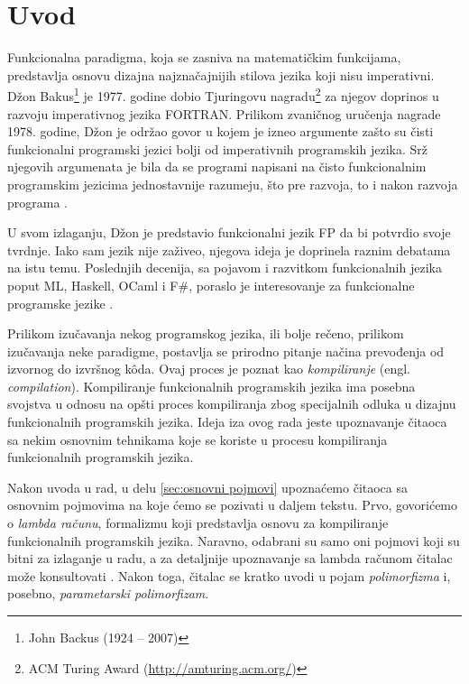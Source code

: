 \section{Uvod}
\label{sec:uvod}

Funkcionalna paradigma, koja se zasniva na matematičkim funkcijama, predstavlja osnovu dizajna najznačajnijih stilova jezika koji nisu imperativni. Džon Bakus\footnote{John Backus (1924 -- 2007)} je 1977. godine dobio Tjuringovu nagradu\footnote{ACM Turing Award (\url{http://amturing.acm.org/})} za njegov doprinos u razvoju imperativnog jezika FORTRAN. Prilikom zvaničnog uručenja nagrade 1978. godine, Džon je održao govor u kojem je izneo argumente zašto su čisti funkcionalni programski jezici bolji od imperativnih programskih jezika. Srž njegovih argumenata je bila da se programi napisani na čisto funkcionalnim programskim jezicima jednostavnije razumeju, što pre razvoja, to i nakon razvoja programa \cite{Can-Programming-Be-Liberated-from-the-von-Neumann-Style?, Concepts-of-Programming-Languages}.

U svom izlaganju, Džon je predstavio funkcionalni jezik FP da bi potvrdio svoje tvrdnje. Iako sam jezik nije zaživeo, njegova ideja je doprinela raznim debatama na istu temu. Poslednjih decenija, sa pojavom i razvitkom funkcionalnih jezika poput ML, Haskell, OCaml i F\#, poraslo je interesovanje za funkcionalne programske jezike \cite{Concepts-of-Programming-Languages}.

Prilikom izučavanja nekog programskog jezika, ili bolje rečeno, prilikom izučavanja neke paradigme, postavlja se prirodno pitanje načina prevođenja od izvornog do izvršnog k\^oda. Ovaj proces je poznat kao \textit{kompiliranje} (engl. \textit{compilation}). Kompiliranje funkcionalnih programskih jezika ima posebna svojstva u odnosu na opšti proces kompiliranja zbog specijalnih odluka u dizajnu funkcionalnih programskih jezika. Ideja iza ovog rada jeste upoznavanje čitaoca sa nekim osnovnim tehnikama koje se koriste u procesu kompiliranja funkcionalnih programskih jezika.

Nakon uvoda u rad, u delu \ref{sec:osnovni pojmovi} upoznaćemo čitaoca sa osnovnim pojmovima na koje ćemo se pozivati u daljem tekstu. Prvo, govorićemo o \textit{lambda računu}, formalizmu koji predstavlja osnovu za kompiliranje funkcionalnih programskih jezika. Naravno, odabrani su samo oni pojmovi koji su bitni za izlaganje u radu, a za detaljnije upoznavanje sa lambda računom čitalac može konsultovati \cite{Introduction-to-Combinators-and-Lambda-Calculus}. Nakon toga, čitalac se kratko uvodi u pojam \textit{polimorfizma} i, posebno, \textit{parametarski polimorfizam}.

